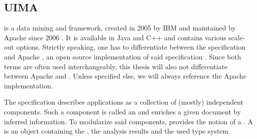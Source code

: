 
\subsection{UIMA}
\uima{} is a data mining and \nlp{} framework, created in 2005 by IBM \cite{ferrucci2004uima} and maintained by Apache since 2006 \cite{uimacpe}. It is available in Java and C++ and contains various scale-out options. 
Strictly speaking, one has to differentiate between the \uima{} specification and Apache \uima{}, an open source implementation of said specification \cite{OASIS:UIMA:2009}. Since both terms are often used interchangeably, this thesis will also not differentiate between Apache \uima{} and \uima{}. Unless specified else, we will always reference the Apache \uima{} implementation.

The \uima{} specification describes \nlp{} applications as a collection of (mostly) independent components. Such a component is called an \anen{} and enriches a given document by inferred information. To modularize said components, \uima{} provides the notion of a \cas{}. A \cas{} is an object containing the \sofa{}, the analysis results and the used type system.
